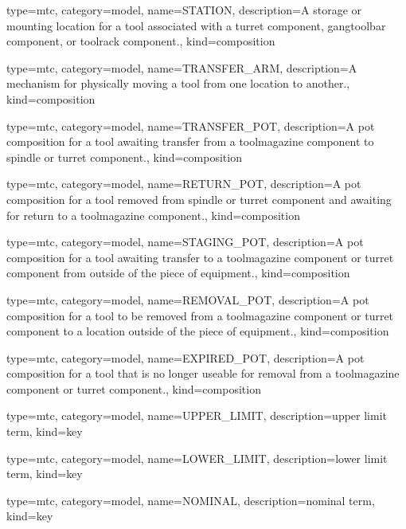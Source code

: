 {
  type=mtc,
  category=model,
  name={STATION},
  description={A storage or mounting location for a tool associated with a \gls{turret component}, \gls{gangtoolbar component}, or \gls{toolrack component}.},
  kind={composition}
}

{
  type=mtc,
  category=model,
  name={TRANSFER\_ARM},
  description={A mechanism for physically moving a tool from one location to another.},
  kind={composition}
}

{
  type=mtc,
  category=model,
  name={TRANSFER\_POT},
  description={A \gls{pot composition} for a tool awaiting transfer from a \gls{toolmagazine component} to \gls{spindle} or \gls{turret component}.},
  kind={composition}
}

{
  type=mtc,
  category=model,
  name={RETURN\_POT},
  description={A \gls{pot composition} for a tool removed from \gls{spindle} or \gls{turret component} and awaiting for return to a \gls{toolmagazine component}.},
  kind={composition}
}

{
  type=mtc,
  category=model,
  name={STAGING\_POT},
  description={A \gls{pot composition} for a tool awaiting transfer to a \gls{toolmagazine component} or \gls{turret component} from outside of the piece of equipment.},
  kind={composition}
}

{
  type=mtc,
  category=model,
  name={REMOVAL\_POT},
  description={A \gls{pot composition} for a tool to be removed from a \gls{toolmagazine component} or \gls{turret component} to a location outside of the piece of equipment.},
  kind={composition}
}

{
  type=mtc,
  category=model,
  name={EXPIRED\_POT},
  description={A \gls{pot composition} for a tool that is no longer useable for removal from a \gls{toolmagazine component} or \gls{turret component}.},
  kind={composition}
}

{
  type=mtc,
  category=model,
  name={UPPER\_LIMIT},
  description={\glsdesc{upper limit term}},
  kind={key}
}

{
  type=mtc,
  category=model,
  name={LOWER\_LIMIT},
  description={\glsdesc{lower limit term}},
  kind={key}
}

{
  type=mtc,
  category=model,
  name={NOMINAL},
  description={\glsdesc{nominal term}},
  kind={key}
}

